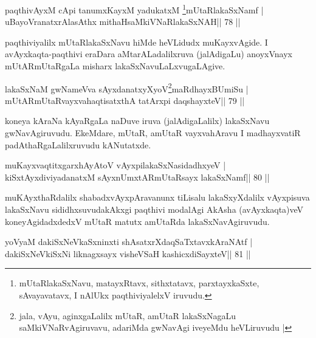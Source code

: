 


\begin{shl}
paqthivAyxM cApi tanumxKayxM yadukatxM \footnote{mUtaRlakaSxNavu, matayxRtavx, sithxtatavx,
  parxtayxkaSxte, sAvayavatavx, I nAlUkx paqthiviyalelxV iruvudu.}mUtaRlakaSxNamf |
uBayoVranatxrAlasAthx mithaHsaMkiVNaRlakaSxNAH\hfill || 78 ||
\end{shl}

\begin{artha}
paqthiviyalilx mUtaRlakaSxNavu hiMde heVLidudx muKayxvAgide. I avAyxkaqta-paqthivi eraDara aMtarALadalilxruva (jalAdigaLu) anoyxVnayx mUtARmUtaRgaLa misharx lakaSxNavuLaLxvugaLAgive.
\end{artha}

\begin{shl}
lakaSxNaM gwNameVva sAyxdanatxyXyoV\footnote{jala, vAyu, aginxgaLalilx mUtaR, amUtaR lakaSxNagaLu
  saMkiVNaRvAgiruvavu, adariMda gwNavAgi iveyeMdu heVLiruvudu |}maRdhayxBUmiSu |
mUtARmUtaRvayxvahaqtisatxthA tatArxpi daqshayxteV\hfill || 79 ||
\end{shl}

\begin{artha}
koneya kAraNa kAyaRgaLa naDuve iruva (jalAdigaLalilx) lakaSxNavu gwNavAgiruvudu. EkeMdare, mUtaR, amUtaR vayxvahAravu I madhayxvatiR padAthaRgaLalilxruvudu kANutatxde.
\end{artha}


\begin{shl}
muKayxvaqtitxgarxhAyAtoV vAyxpilakaSxNasidadhxyeV |
kiSxtAyxdiviyadanatxM sAyxnUmxtARmUtaRsayx lakaSxNamf\hfill || 80 ||
\end{shl}

\begin{artha}
muKAyxthaRdalilx shabadxvAyxpAravanunx tiLisalu lakaSxyXdalilx vAyxpisuva lakaSxNavu sididhxsuvudakAkxgi paqthivi modalAgi AkAsha (avAyxkaqta)veV koneyAgidadxdedxV mUtaR matutx amUtaRda lakaSxNavAgiruvudu.
\end{artha}



\begin{shl}
yoV\s yaM dakiSxNeV\s kaSxninxti shAsatxrXdaqSaTxtavxkAraNAtf |
dakiSxNeV\s kiSxNi liknagxsayx visheVSaH kashicxdiSayxteV\hfill || 81 ||
\end{shl}

